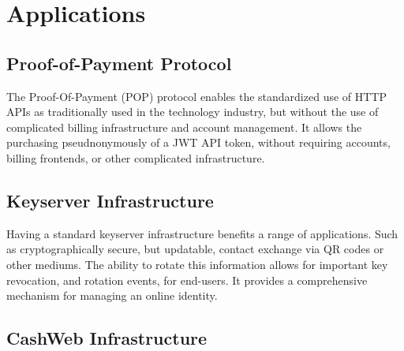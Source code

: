 \documentclass{article}
\begin{document}
\begin{figure}[H]
\centering
{}
\end{figure}

\section{Applications}

\subsection{Proof-of-Payment Protocol}

The Proof-Of-Payment (POP) protocol enables the standardized use of HTTP APIs as traditionally used in the technology industry, but without the use of complicated billing infrastructure and account management. It allows the purchasing pseudnonymously of a JWT API token, without requiring accounts, billing frontends, or other complicated infrastructure.

\subsection{Keyserver Infrastructure}

Having a standard keyserver infrastructure benefits a range of applications. Such as cryptographically secure, but updatable, contact exchange via QR codes or other mediums. The ability to rotate this information allows for important key revocation, and rotation events, for end-users. It provides a comprehensive mechanism for managing an online identity.

\subsection{CashWeb Infrastructure}
\end{document}
